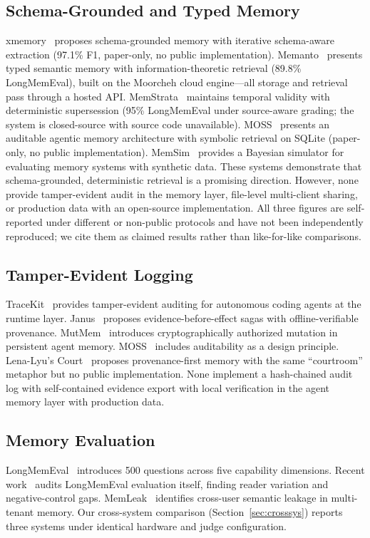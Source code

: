 \documentclass{article}
\begin{document}
\subsection{Schema-Grounded and Typed Memory}
xmemory~\citep{xmemory} proposes schema-grounded memory with iterative schema-aware extraction (97.1\% F1, paper-only, no public implementation). Memanto~\citep{memanto} presents typed semantic memory with information-theoretic retrieval (89.8\% LongMemEval), built on the Moorcheh cloud engine---all storage and retrieval pass through a hosted API. MemStrata~\citep{memstrata} maintains temporal validity with deterministic supersession (95\% LongMemEval under source-aware grading; the system is closed-source with source code unavailable). MOSS~\citep{moss} presents an auditable agentic memory architecture with symbolic retrieval on SQLite (paper-only, no public implementation). MemSim~\citep{memsim} provides a Bayesian simulator for evaluating memory systems with synthetic data. These systems demonstrate that schema-grounded, deterministic retrieval is a promising direction. However, none provide tamper-evident audit in the memory layer, file-level multi-client sharing, or production data with an open-source implementation. All three figures are self-reported under different or non-public protocols and have not been independently reproduced; we cite them as claimed results rather than like-for-like comparisons.

\subsection{Tamper-Evident Logging}
TraceKit~\citep{tracekit} provides tamper-evident auditing for autonomous coding agents at the runtime layer. Janus~\citep{janus} proposes evidence-before-effect sagas with offline-verifiable provenance. MutMem~\citep{mutmem} introduces cryptographically authorized mutation in persistent agent memory. MOSS~\citep{moss} includes auditability as a design principle. Lena-Lyu's Court~\citep{court} proposes provenance-first memory with the same ``courtroom'' metaphor but no public implementation. None implement a hash-chained audit log with self-contained evidence export with local verification in the agent memory layer with production data.

\subsection{Memory Evaluation}
LongMemEval~\citep{wu2024longmemeval} introduces 500 questions across five capability dimensions. Recent work~\citep{auditlme} audits LongMemEval evaluation itself, finding reader variation and negative-control gaps. MemLeak~\citep{memleak} identifies cross-user semantic leakage in multi-tenant memory. Our cross-system comparison (Section~\ref{sec:crosssys}) reports three systems under identical hardware and judge configuration.
\end{document}
